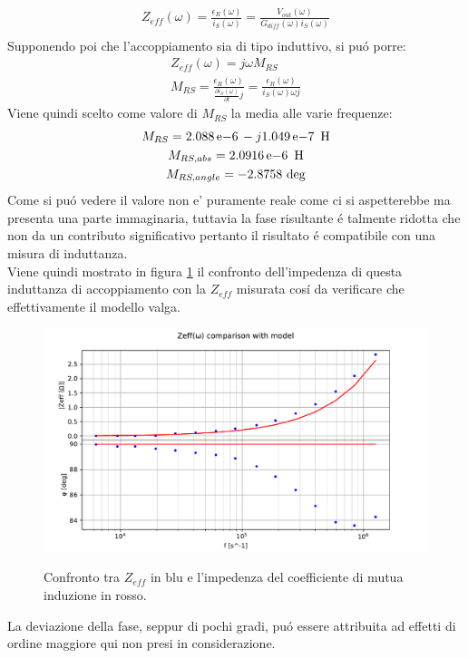 \begin{gather}
	Z_{eff}(\omega) = \frac{\epsilon_R(\omega)}{i_S(\omega)}= \frac{V_{out}(\omega)}{G_{diff}(\omega) i_S(\omega)} \\
\end{gather}
Supponendo poi che l'accoppiamento sia di tipo induttivo, si pu\'o porre:
\begin{gather}
	Z_{eff}(\omega)=j \omega M_{RS} \\
	M_{RS} = \frac{\epsilon_R(\omega)}{\frac{\partial i_S(\omega)}{\partial t} j} = \frac{\epsilon_R(\omega)}{i_S(\omega) \omega j}
\end{gather}
Viene quindi scelto come valore di $M_{RS}$ la media alle varie frequenze:
\begin{gather}
	M_{RS}= 2.088\E{-6}-j1.049\E{-7}\ \si{\henry} \\
	M_{RS,abs}=2.0916\E{-6}\ \si{\henry} \\
	M_{RS,angle}=-2.8758 \ \si{\deg}
\end{gather}
Come si pu\'o vedere il valore non e' puramente reale come ci si aspetterebbe ma presenta una parte immaginaria, tuttavia la fase risultante \'e talmente ridotta che non da un contributo significativo pertanto il risultato \'e compatibile con una misura di induttanza. \\
Viene quindi mostrato in figura \ref{fig:zeff} il confronto dell'impedenza di questa induttanza di accoppiamento con la $Z_{eff}$ misurata cos\'i da verificare che effettivamente il modello valga.
\begin{figure}[h]
	\centering
    \includegraphics[width=\textwidth]{Figure_15.pdf}
    \label{fig:zeff}
    \caption{Confronto tra $Z_{eff}$ in blu e l'impedenza del coefficiente di mutua induzione in rosso.}
\end{figure}
La deviazione della fase, seppur di pochi gradi, pu\'o essere attribuita ad effetti di ordine maggiore qui non presi in considerazione.\\

